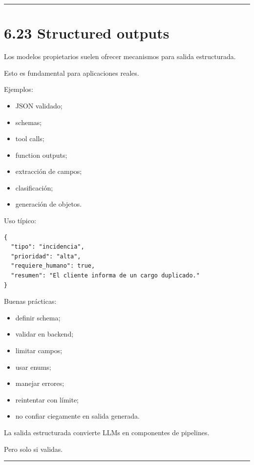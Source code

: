 \begin{center}\rule{0.5\linewidth}{0.5pt}\end{center}

\section{6.23 Structured outputs}\label{structured-outputs}

Los modelos propietarios suelen ofrecer mecanismos para salida
estructurada.

Esto es fundamental para aplicaciones reales.

Ejemplos:

\begin{itemize}
\tightlist
\item
  JSON validado;
\item
  schemas;
\item
  tool calls;
\item
  function outputs;
\item
  extracción de campos;
\item
  clasificación;
\item
  generación de objetos.
\end{itemize}

Uso típico:

\begin{lstlisting}
{
  "tipo": "incidencia",
  "prioridad": "alta",
  "requiere_humano": true,
  "resumen": "El cliente informa de un cargo duplicado."
}
\end{lstlisting}

Buenas prácticas:

\begin{itemize}
\tightlist
\item
  definir schema;
\item
  validar en backend;
\item
  limitar campos;
\item
  usar enums;
\item
  manejar errores;
\item
  reintentar con límite;
\item
  no confiar ciegamente en salida generada.
\end{itemize}

La salida estructurada convierte LLMs en componentes de pipelines.

Pero solo si validas.

\begin{center}\rule{0.5\linewidth}{0.5pt}\end{center}

